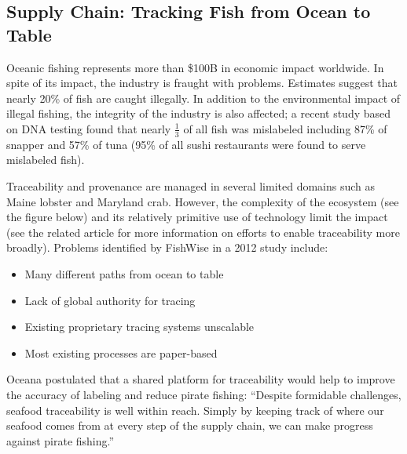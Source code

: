 \subsection{Supply Chain: Tracking Fish from Ocean to Table}

Oceanic fishing represents more than \$100B in economic impact worldwide. In spite of its impact,
the industry is fraught with problems. Estimates suggest that nearly 20\% of fish are caught
illegally. In addition to the environmental impact of illegal fishing, the integrity of the industry
is also affected; a recent study based on DNA testing found that nearly $\frac{1}{3}$ of all fish
was mislabeled including 87\% of snapper and 57\% of tuna (95\% of all sushi restaurants were found
to serve mislabeled fish).

Traceability and provenance are managed in several limited domains such as Maine lobster and
Maryland crab. However, the complexity of the ecosystem (see the figure below) and its relatively
primitive use of technology limit the impact (see the related article for more information on efforts to
enable traceability more broadly). Problems identified by FishWise in a 2012 study include:

\begin{itemize}
\item Many different paths from ocean to table
\item Lack of global authority for tracing
\item Existing proprietary tracing systems unscalable
\item Most existing processes are paper-based
\end{itemize}

Oceana postulated that a shared platform for traceability would help to improve the accuracy of
labeling and reduce pirate fishing: ``Despite formidable challenges, seafood traceability is well
within reach. Simply by keeping track of where our seafood comes from at every step of the supply
chain, we can make progress against pirate fishing.''

